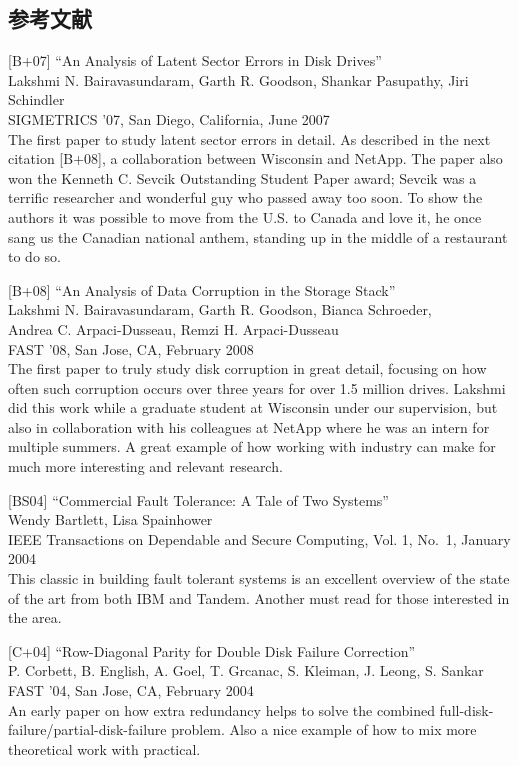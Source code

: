\hypertarget{ux53c2ux8003ux6587ux732e-32}{%
\subsection*{参考文献}\label{ux53c2ux8003ux6587ux732e-32}}

{[}B+07{]} ``An Analysis of Latent Sector Errors in Disk Drives''\\
Lakshmi N. Bairavasundaram, Garth R. Goodson, Shankar Pasupathy, Jiri
Schindler\\
SIGMETRICS '07, San Diego, California, June 2007\\
The first paper to study latent sector errors in detail. As described in
the next citation {[}B+08{]}, a collaboration between Wisconsin and
NetApp. The paper also won the Kenneth C. Sevcik Outstanding Student
Paper award; Sevcik was a terrific researcher and wonderful guy who
passed away too soon. To show the authors it was possible to move from
the U.S. to Canada and love it, he once sang us the Canadian national
anthem, standing up in the middle of a restaurant to do so.

{[}B+08{]} ``An Analysis of Data Corruption in the Storage Stack''\\
Lakshmi N. Bairavasundaram, Garth R. Goodson, Bianca Schroeder,\\
Andrea C. Arpaci-Dusseau, Remzi H. Arpaci-Dusseau\\
FAST '08, San Jose, CA, February 2008\\
The first paper to truly study disk corruption in great detail, focusing
on how often such corruption occurs over three years for over 1.5
million drives. Lakshmi did this work while a graduate student at
Wisconsin under our supervision, but also in collaboration with his
colleagues at NetApp where he was an intern for multiple summers. A
great example of how working with industry can make for much more
interesting and relevant research.

{[}BS04{]} ``Commercial Fault Tolerance: A Tale of Two Systems''\\
Wendy Bartlett, Lisa Spainhower\\
IEEE Transactions on Dependable and Secure Computing, Vol. 1, No.~1,
January 2004\\
This classic in building fault tolerant systems is an excellent overview
of the state of the art from both IBM and Tandem. Another must read for
those interested in the area.

{[}C+04{]} ``Row-Diagonal Parity for Double Disk Failure Correction''\\
P. Corbett, B. English, A. Goel, T. Grcanac, S. Kleiman, J. Leong, S.
Sankar\\
FAST '04, San Jose, CA, February 2004\\
An early paper on how extra redundancy helps to solve the combined
full-disk-failure/partial-disk-failure problem. Also a nice example of
how to mix more theoretical work with practical.

